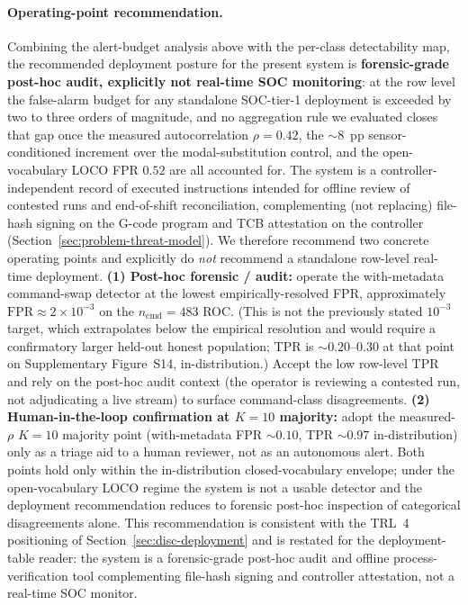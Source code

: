 \documentclass[sensors,article,submit,moreauthors,pdftex]{Definitions/mdpi}
\begin{document}
\paragraph{Operating-point recommendation.} Combining the alert-budget analysis above with the per-class detectability map, the recommended deployment posture for the present system is \textbf{forensic-grade post-hoc audit, explicitly not real-time SOC monitoring}: at the row level the false-alarm budget for any standalone SOC-tier-1 deployment is exceeded by two to three orders of magnitude, and no aggregation rule we evaluated closes that gap once the measured autocorrelation $\rho\!=\!0.42$, the $\sim 8$~pp sensor-conditioned increment over the modal-substitution control, and the open-vocabulary LOCO FPR $0.52$ are all accounted for. The system is a controller-independent record of executed instructions intended for offline review of contested runs and end-of-shift reconciliation, complementing (not replacing) file-hash signing on the G-code program and TCB attestation on the controller (Section~\ref{sec:problem-threat-model}). We therefore recommend two concrete operating points and explicitly do \emph{not} recommend a standalone row-level real-time deployment. \textbf{(1) Post-hoc forensic / audit:} operate the with-metadata command-swap detector at the lowest empirically-resolved FPR, approximately $\mathrm{FPR}\!\approx\!2\!\times\!10^{-3}$ on the $n_{\text{cmd}}\!=\!483$ ROC. (This is not the previously stated $10^{-3}$ target, which extrapolates below the empirical resolution and would require a confirmatory larger held-out honest population; TPR is $\sim 0.20$--$0.30$ at that point on Supplementary Figure~S14, in-distribution.) Accept the low row-level TPR and rely on the post-hoc audit context (the operator is reviewing a contested run, not adjudicating a live stream) to surface command-class disagreements. \textbf{(2) Human-in-the-loop confirmation at $K\!=\!10$ majority:} adopt the measured-$\rho$ $K\!=\!10$ majority point (with-metadata FPR $\sim 0.10$, TPR $\sim 0.97$ in-distribution) only as a triage aid to a human reviewer, not as an autonomous alert. Both points hold only within the in-distribution closed-vocabulary envelope; under the open-vocabulary LOCO regime the system is not a usable detector and the deployment recommendation reduces to forensic post-hoc inspection of categorical disagreements alone. This recommendation is consistent with the TRL~4 positioning of Section~\ref{sec:disc-deployment} and is restated for the deployment-table reader: the system is a forensic-grade post-hoc audit and offline process-verification tool complementing file-hash signing and controller attestation, not a real-time SOC monitor.
\end{document}
